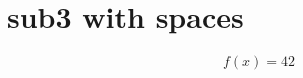 \section{sub3 with spaces}\label{sec:sub3 with spaces}

\begin{equation}
  f(x) = 42
  \label{eq:inputted sub with spaces is working}
\end{equation}
